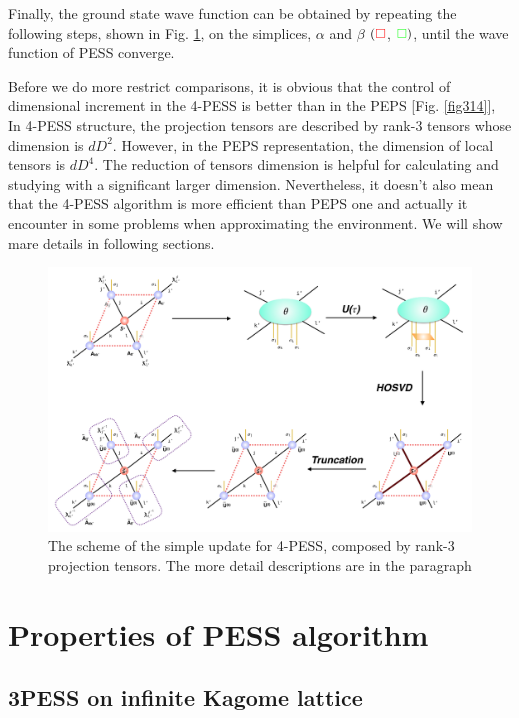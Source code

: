 Finally, the ground state wave function can be obtained by repeating the following steps, shown in Fig. \ref{fig4326}, on the simplices, $\alpha$ and $\beta$ $( \color{red} \square$, ${\color{green} \square})$, until the wave function of PESS converge.

Before we do more restrict comparisons, it is obvious that the control of dimensional increment in the 4-PESS is better than in the PEPS [Fig. \ref{fig314}], In 4-PESS structure, the projection tensors are described by rank-3 tensors whose dimension is $dD^2$. However, in the PEPS representation, the dimension of local tensors is $dD^4$. The reduction of tensors dimension is helpful for calculating and studying with a significant larger dimension. Nevertheless, it doesn't also mean that the 4-PESS algorithm is more efficient than PEPS one and actually it encounter in some problems when approximating the environment. We will show mare details in following sections.

\begin{figure}[ht]
	\centering
	\includegraphics[width=1.00\textwidth]{figures/fig4326.png}
	\caption[The scheme of the simple update for 4-PESS, composed by rank-3 projection tensors.]{The scheme of the simple update for 4-PESS, composed by rank-3 projection tensors. The more detail descriptions are in the paragraph}
	\label{fig4326}
\end{figure}

\section{Properties of PESS algorithm}

\subsection{3PESS on infinite Kagome lattice}

